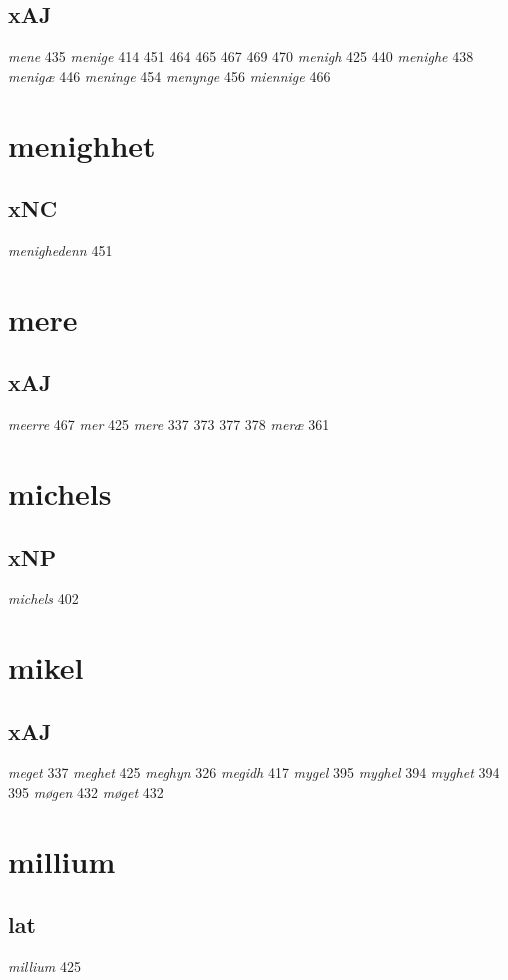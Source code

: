 \documentclass[a4paper,twocolumn]{article}
\begin{document}
\subsection{xAJ}
\label{sec:orgeaf239b}
\emph{mene} 435 \emph{menige} 414 451 464 465 467 469 470 \emph{menigh} 425 440 \emph{menighe} 438 \emph{menigæ} 446 \emph{meninge} 454 \emph{menynge} 456 \emph{miennige} 466 
\section{menighhet}
\label{sec:org460a35d}
\subsection{xNC}
\label{sec:orgc48ac67}
\emph{menighedenn} 451 
\section{mere}
\label{sec:orgb0d91bc}
\subsection{xAJ}
\label{sec:org5f19583}
\emph{meerre} 467 \emph{mer} 425 \emph{mere} 337 373 377 378 \emph{meræ} 361 
\section{michels}
\label{sec:orgc709aed}
\subsection{xNP}
\label{sec:org5e5b545}
\emph{michels} 402 
\section{mikel}
\label{sec:org748119d}
\subsection{xAJ}
\label{sec:orge735c56}
\emph{meget} 337 \emph{meghet} 425 \emph{meghyn} 326 \emph{megidh} 417 \emph{mygel} 395 \emph{myghel} 394 \emph{myghet} 394 395 \emph{møgen} 432 \emph{møget} 432 
\section{millium}
\label{sec:org37f6387}
\subsection{lat}
\label{sec:orgc6c38ca}
\emph{millium} 425 
\end{document}
